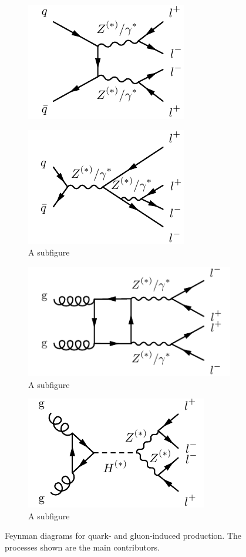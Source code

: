 \begin{figure}
\centering
\begin{subfigure}{.24\textwidth}
  \centering
  \includegraphics[width=.23\textwidth]{Figures/FeynGraphs/qqZZ4l.pdf}
  \caption{\qqZZ}
  \label{fig:m4lfeynman:qqZZ}
\end{subfigure}%
\begin{subfigure}{.24\textwidth}
  \centering
  \includegraphics[width=.23\textwidth]{Figures/FeynGraphs/qqZZ4lrad.pdf}
  \caption{A subfigure}
  \label{fig:m4lfeynman:singleZ}
\end{subfigure}
\begin{subfigure}{.24\textwidth}
  \centering
  \includegraphics[width=.23\textwidth]{Figures/FeynGraphs/ggZZ4lbox.pdf}
  \caption{A subfigure}
  \label{fig:m4lfeynman:ggZZ}
\end{subfigure}
\begin{subfigure}{.24\textwidth}
  \centering
  \includegraphics[width=.23\textwidth]{Figures/FeynGraphs/ggZZ4lhiggs.pdf}
  \caption{A subfigure}
  \label{fig:m4lfeynman:ggHZZ}
\end{subfigure}
\caption{Feynman diagrams for quark- and gluon-induced \ZZ production. The processes shown are the main contributors.}
\label{fig:m4lfeynman}
\end{figure}


